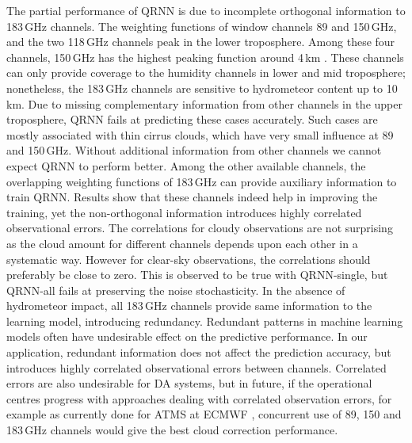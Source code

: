 \documentclass[amt, manuscript]{copernicus}
\begin{document}
The partial performance of QRNN is due to incomplete orthogonal information to 183\,GHz channels. The weighting functions of window channels 89 and 150\,GHz, and the two 118\,GHz channels peak in the lower troposphere. Among these four channels, 150\,GHz has the highest peaking function around 4\,km \citep{chen2020mwhs}. These channels can only provide coverage to the humidity channels in lower and mid troposphere; nonetheless, the 183\,GHz channels are sensitive to hydrometeor content up to 10\,km. Due to missing complementary information from other channels in the upper troposphere, QRNN fails at predicting these cases accurately. Such cases are mostly associated with thin cirrus clouds, which have very small influence at 89 and 150\,GHz. Without additional information from other channels we cannot expect QRNN to perform better. Among the other available channels, the overlapping weighting functions of 183\,GHz can provide auxiliary information to train QRNN. Results show that these channels indeed help in improving the training, yet the non-orthogonal information introduces highly correlated observational errors. The correlations for cloudy observations are not surprising as the cloud amount for different channels depends upon each other in a systematic way. However for clear-sky observations, the correlations should preferably be close to zero. This is observed to be true with QRNN-single, but QRNN-all fails at preserving the noise stochasticity. In the absence of hydrometeor impact, all 183\,GHz channels provide same information to the learning model, introducing redundancy. Redundant patterns in machine learning models often have undesirable effect on the predictive performance. In our application, redundant information does not affect the prediction accuracy, but introduces highly correlated observational errors between channels. Correlated errors are also undesirable for DA systems, but in future, if the operational centres progress with approaches dealing with correlated observation errors, for example as currently done for ATMS at ECMWF \citep{Weston2018eumATMS}, concurrent use of 89, 150 and 183\,GHz channels would give the best cloud correction performance.
\end{document}
